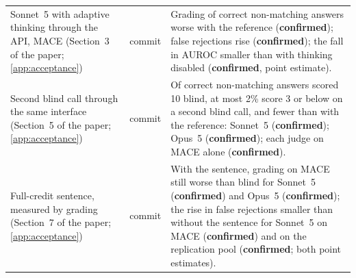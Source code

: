 {\begin{longtable}{L{3.2cm}L{1.1cm}L{8.7cm}}
Sonnet~5 with adaptive thinking through the API, \textsc{MACE} (Section~3 of the paper; \cref{app:acceptance}) & commit & Grading of correct non-matching answers worse with the reference (\textbf{confirmed}); false rejections rise (\textbf{confirmed}); the fall in AUROC smaller than with thinking disabled (\textbf{confirmed}, point estimate). \\
Second blind call through the same interface (Section~5 of the paper; \cref{app:acceptance}) & commit & Of correct non-matching answers scored 10 blind, at most 2\% score 3 or below on a second blind call, and fewer than with the reference: Sonnet~5 (\textbf{confirmed}); Opus~5 (\textbf{confirmed}); each judge on \textsc{MACE} alone (\textbf{confirmed}). \\
Full-credit sentence, measured by grading (Section~7 of the paper; \cref{app:acceptance}) & commit & With the sentence, grading on \textsc{MACE} still worse than blind for Sonnet~5 (\textbf{confirmed}) and Opus~5 (\textbf{confirmed}); the rise in false rejections smaller than without the sentence for Sonnet~5 on \textsc{MACE} (\textbf{confirmed}) and on the replication pool (\textbf{confirmed}; both point estimates). \\


\end{longtable}}

